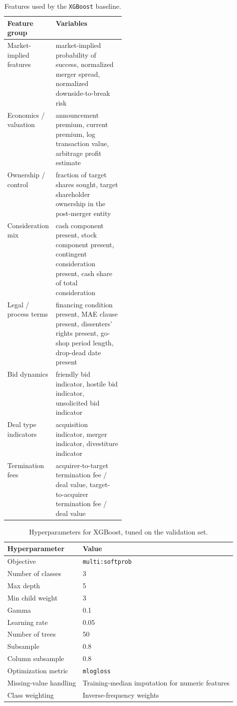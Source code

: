 \documentclass{article}
\theoremstyle{plain}
\theoremstyle{definition}
\theoremstyle{remark}
\begin{document}
\begin{table}[h]
\centering
\small
\begin{tabularx}{\linewidth}{@{} >{\raggedright\arraybackslash}p{0.28\linewidth} X @{}}
\toprule
\textbf{Feature group} & \textbf{Variables} \\
\midrule
Market-implied features &
market-implied probability of success, normalized merger spread, normalized downside-to-break risk \\
Economics / valuation &
announcement premium, current premium, log transaction value, arbitrage profit estimate \\
Ownership / control &
fraction of target shares sought, target shareholder ownership in the post-merger entity \\
Consideration mix &
cash component present, stock component present, contingent consideration present, cash share of total consideration \\
Legal / process terms &
financing condition present, MAE clause present, dissenters' rights present, go-shop period length, drop-dead date present \\
Bid dynamics &
friendly bid indicator, hostile bid indicator, unsolicited bid indicator \\
Deal type indicators &
acquisition indicator, merger indicator, divestiture indicator \\
Termination fees &
acquirer-to-target termination fee / deal value, target-to-acquirer termination fee / deal value \\
\bottomrule
\end{tabularx}
\caption{Features used by the \texttt{XGBoost} baseline.}
\label{tab:xgb-bbg-features}
\end{table}

\begin{table}[h!]
\centering
\small
\begin{tabular}{@{} ll @{}}
\toprule
\textbf{Hyperparameter} & \textbf{Value} \\
\midrule
Objective & \texttt{multi:softprob} \\
Number of classes & 3 \\
Max depth & 5 \\
Min child weight & 3 \\
Gamma & 0.1 \\
Learning rate & 0.05 \\
Number of trees & 50 \\
Subsample & 0.8 \\
Column subsample & 0.8 \\
Optimization metric & \texttt{mlogloss} \\
Missing-value handling & Training-median imputation for numeric features \\
Class weighting & Inverse-frequency weights \\
\bottomrule
\end{tabular}
\caption{Hyperparameters for XGBoost, tuned on the validation set.}
\label{tab:xgb-bbg-hparams}
\end{table}
\end{document}
